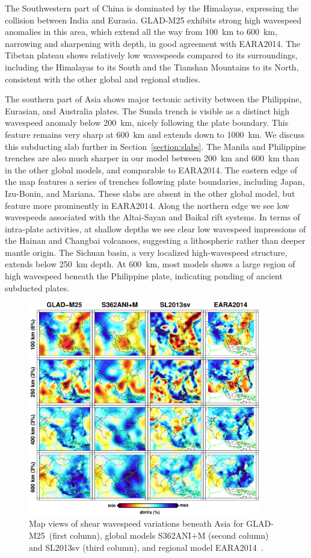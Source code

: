 \documentclass[extra,mreferee]{gji}
\begin{document}
The Southwestern part of China is dominated by the Himalayas,
expressing the collision between India and Eurasia.
GLAD-M25 exhibits strong high wavespeed anomalies in this area,
which extend all the way from 100~km to 600~km, narrowing and sharpening with depth,
in good agreement with EARA2014.
The Tibetan plateau shows relatively low wavespeeds
compared to its surroundings, including the Himalayas to its South and
the Tianshan Mountains to its North, consistent with the other global
and regional studies.

The southern part of Asia shows major tectonic activity between the
Philippine, Eurasian, and Australia plates.
The Sunda trench is visible as a distinct high wavespeed anomaly below 200~km,
nicely following the plate boundary.
This feature remains very sharp at 600~km and extends
down to 1000~km.
We discuss this subducting slab further in Section~\ref{section:slabs}.
The Manila and Philippine trenches are also much sharper in our model between 200~km and
600~km than in the other global models, and comparable to EARA2014.
The eastern edge of the map features a series of trenches following plate boundaries,
including Japan, Izu-Bonin, and Mariana.
These slabs are absent in the other global model,
but feature more prominently in EARA2014.
Along the northern edge we see low wavespeeds associated with the
Altai-Sayan and Baikal rift systems.
In terms of intra-plate activities,
at shallow depths we see clear low wavespeed impressions of the Hainan and Changbai volcanoes,
suggesting a lithospheric rather than deeper mantle origin.
The Sichuan basin, a very localized high-wavespeed structure, extends below
250~km depth. At 600~km, most models shows a large region of high wavespeed
beneath the Philippine plate, indicating ponding of ancient subducted plates.

\begin{figure}
  \includegraphics[width=0.9\textwidth]{figures/depth_slice/asia_vs.pdf}
  \caption{Map views of shear wavespeed variations beneath Asia for GLAD-M25~(first column),
  global models S362ANI$+$M (second column) and SL2013sv (third column), and regional model EARA2014~\citep[last column;][]{chen2015multiparameter}.}
  \label{fig:asia-vs}
  \centering
\end{figure}
\end{document}
